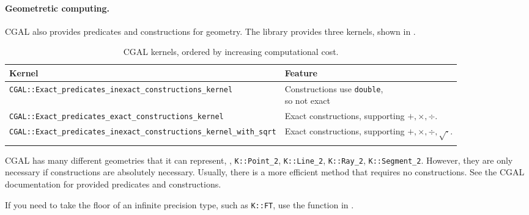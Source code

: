 \documentclass[justified,nobib]{tufte-handout}
\begin{document}
\paragraph{Geometretic computing.}

CGAL also provides predicates and constructions for geometry. The library
provides three kernels, shown in .

\begin{table*}[h]
    \centering
    \caption{CGAL kernels, ordered by increasing computational cost.}
    \label{tab:cgal-kernels}
    \begin{tabular}{ll} \toprule
        Kernel                                                                       & Feature                                         \\
        \midrule
        \texttt{CGAL::Exact\_predicates\_inexact\_constructions\_kernel}             & \makecell[l]{Constructions use \texttt{double}, \\so not exact} \\
        \texttt{CGAL::Exact\_predicates\_exact\_constructions\_kernel}               & \makecell[l]{Exact constructions,               \\supporting $+,\times,\div$.} \\
        \texttt{CGAL::Exact\_predicates\_inexact\_constructions\_kernel\_with\_sqrt} & \makecell[l]{Exact constructions,               \\supporting $+,\times,\div,\sqrt{\cdot}$.} \\
        \bottomrule                                                                                                                    \\
    \end{tabular}
\end{table*}

CGAL has many different geometries that it can represent, \eg,
\texttt{K::Point\_2}, \texttt{K::Line\_2}, \texttt{K::Ray\_2},
\texttt{K::Segment\_2}. However, they are only necessary if constructions are
absolutely necessary. Usually, there is a more
efficient method that requires no constructions. See the CGAL documentation for
provided predicates and constructions.

If you need to take the floor of an infinite precision type, such as
\texttt{K::FT}, use the function in .
\end{document}
